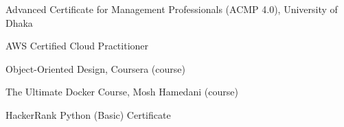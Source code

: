 %
%
%



\begin{scholarship}

        {Advanced Certificate for Management Professionals (ACMP 4.0), University of Dhaka}

        {AWS Certified Cloud Practitioner}

        {Object-Oriented Design, Coursera (course)}

        {The Ultimate Docker Course, Mosh Hamedani (course)}

        {HackerRank Python (Basic) Certificate}

\end{scholarship}
